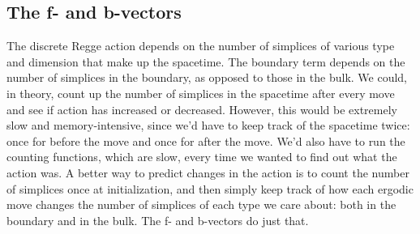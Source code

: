 \message{ !name(programmers_guide.tex)}\documentclass[12pt]{article}
\begin{document}
\subsection{The f- and b-vectors}
\label{s:f-and-b-vectors}

The discrete Regge action depends on the number of simplices of
various type and dimension that make up the spacetime. The boundary
term depends on the number of simplices in the boundary, as opposed to
those in the bulk. We could, in theory, count up the number of
simplices in the spacetime after every move and see if action has
increased or decreased. However, this would be extremely slow and
memory-intensive, since we'd have to keep track of the spacetime
twice: once for before the move and once for after the move. We'd also
have to run the counting functions, which are slow, every time we
wanted to find out what the action was. A better way to predict
changes in the action is to count the number of simplices once at
initialization, and then simply keep track of how each ergodic move
changes the number of simplices of each type we care about: both in
the boundary and in the bulk. The f- and b-vectors do just that.
\end{document}
